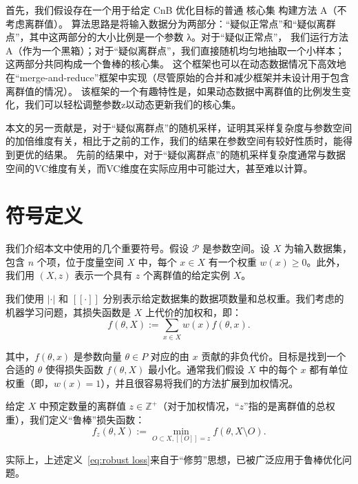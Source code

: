 首先，我们假设存在一个用于给定 CnB 优化目标的普通 核心集 构建方法 A（不考虑离群值）。
算法思路是将输入数据分为两部分：“疑似正常点”和“疑似离群点”，其中这两部分的大小比例是一个参数 λ。对于“疑似正常点”，
我们运行方法 A（作为一个黑箱）；对于“疑似离群点”，我们直接随机均匀地抽取一个小样本；
这两部分共同构成一个鲁棒的核心集。
这个框架也可以在动态数据情况下高效地在“merge-and-reduce”框架中实现（尽管原始的合并和减少框架并未设计用于包含离群值的情况）\cite{DBLP:conf/stoc/Har-PeledM04,DBLP:conf/esa/HenzingerK20}。
该框架的一个有趣特性是，如果动态数据中离群值的比例发生变化，我们可以轻松调整参数z以动态更新我们的核心集。

本文的另一贡献是，对于“疑似离群点”的随机采样，证明其采样复杂度与参数空间的加倍维度有关，相比于之前的工作，我们的结果在参数空间有较好性质时，能得到更优的结果。
先前的结果中，对于“疑似离群点”的随机采样复杂度通常与数据空间的VC维度有关，而VC维度在实际应用中可能过大，甚至难以计算。




\section{符号定义}


我们介绍本文中使用的几个重要符号。假设 $\mathcal{P}$ 是参数空间。设 $X$ 为输入数据集，包含 $n$ 个项，位于度量空间 $X$ 中，每个 $x \in X$ 有一个权重 $w(x) \geq 0$。此外，我们用 $(X, z)$ 表示一个具有 $z$ 个离群值的给定实例 $X$。

我们使用 $| \cdot |$ 和 $[[ \cdot ]]$ 分别表示给定数据集的数据项数量和总权重。我们考虑的机器学习问题，其损失函数是 $X$ 上代价的加权和，即：
\begin{equation}
f(\theta, X) := \sum_{x \in X} w(x) f(\theta, x).
\label{eq:loss}
\end{equation}

其中，$f(\theta, x)$ 是参数向量 $\theta \in P$ 对应的由 $x$ 贡献的非负代价。目标是找到一个合适的 $\theta$ 使得损失函数 $f(\theta, X)$ 最小化。通常我们假设 $X$ 中的每个 $x$ 都有单位权重（即，$w(x) = 1$），并且很容易将我们的方法扩展到加权情况。

给定 $X$ 中预定数量的离群值 $z \in \mathbb{Z}^+$（对于加权情况，“$z$”指的是离群值的总权重），我们定义“鲁棒”损失函数：
\begin{equation}
f_z(\theta, X) := \min_{O \subset X, [[O]] = z} f(\theta, X \setminus O).
\label{eq:robust loss}
\end{equation}

实际上，上述定义~\eqref{eq:robust loss}来自于“修剪”思想，已被广泛应用于鲁棒优化问题\cite{DBLP:books/wi/RousseeuwL87}。


